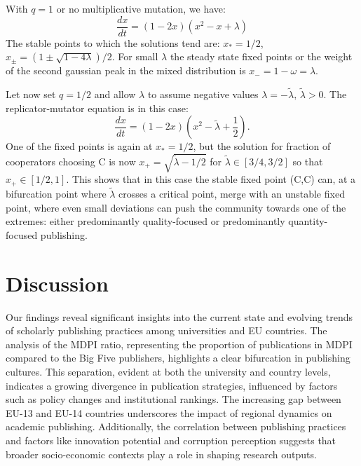 \documentclass[amsfonts, amssymb, prl, superscriptaddress, notitlepage, twocolumn, nofootinbib]{revtex4-2}
\begin{document}
With $q=1$ or no multiplicative mutation, we have:
\begin{equation}
    \frac{dx}{dt} = (1-2x)(x^2-x+\lambda)
\end{equation}
The stable points to which the solutions tend are: $x_*=1/2$, $x_{\pm}=(1\pm\sqrt{1-4\lambda})/2$. For small $\lambda$ the steady state fixed points or the weight of the second gaussian peak in the mixed distribution is $x_- =1-\omega=\lambda$.

Let now set $q=1/2$ and allow $\lambda$ to assume negative values $\lambda = -\tilde{\lambda},\, \tilde{\lambda}>0$. The replicator-mutator equation is in this case:
\begin{equation}
    \frac{dx}{dt} = (1-2x)\left(x^2-\tilde{\lambda} +\frac{1}{2}\right).
\end{equation}
One of the fixed points is again at $x_*=1/2$, but the solution for fraction of cooperators choosing C is now $x_+ = \sqrt{\tilde{\lambda}-1/2}$ for $\tilde\lambda\in [3/4,3/2]$ so that $x_+ \in [1/2,1]$. This shows that in this case the stable fixed point (C,C) can, at a bifurcation point where $\tilde\lambda$ crosses a critical point, merge with an unstable fixed point, where even small deviations can push the community towards one of the extremes: either predominantly quality-focused or predominantly quantity-focused publishing. 


\section{Discussion}
Our findings reveal significant insights into the current state and evolving trends of scholarly publishing practices among universities and EU countries. The analysis of the MDPI ratio, representing the proportion of publications in MDPI compared to the Big Five publishers, highlights a clear bifurcation in publishing cultures. This separation, evident at both the university and country levels, indicates a growing divergence in publication strategies, influenced by factors such as policy changes and institutional rankings. The increasing gap between EU-13 and EU-14 countries underscores the impact of regional dynamics on academic publishing. Additionally, the correlation between publishing practices and factors like innovation potential and corruption perception suggests that broader socio-economic contexts play a role in shaping research outputs. 
\end{document}
